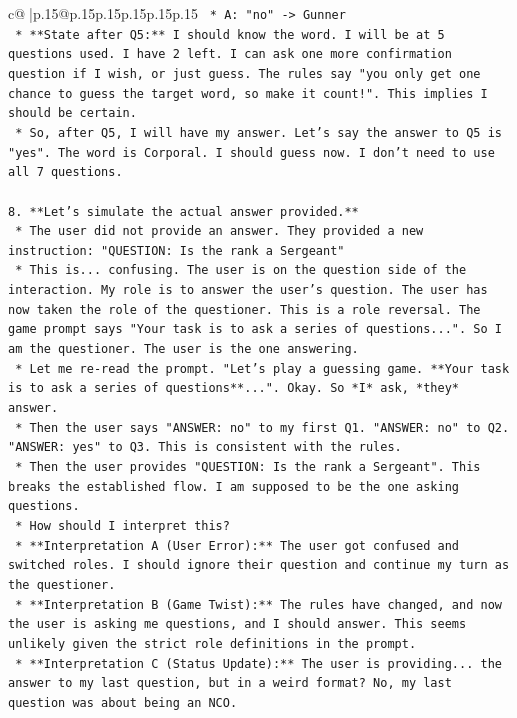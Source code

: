 \documentclass{article}
\begin{document}
{\begin{supertabular}{c@{$\;$}|p{.15\linewidth}@{}p{.15\linewidth}p{.15\linewidth}p{.15\linewidth}p{.15\linewidth}p{.15\linewidth}}
{{{\texttt{        *   A: "no" {-}> Gunner} \\
\texttt{    *   **State after Q5:** I should know the word. I will be at 5 questions used. I have 2 left. I can ask one more confirmation question if I wish, or just guess. The rules say "you only get one chance to guess the target word, so make it count!". This implies I should be certain.} \\
\texttt{    *   So, after Q5, I will have my answer. Let's say the answer to Q5 is "yes". The word is Corporal. I should guess now. I don't need to use all 7 questions.} \\
\\ 
\texttt{8.  **Let's simulate the actual answer provided.**} \\
\texttt{    *   The user did not provide an answer. They provided a new instruction: "QUESTION: Is the rank a Sergeant"} \\
\texttt{    *   This is... confusing. The user is on the question side of the interaction. My role is to answer the user's question. The user has now taken the role of the questioner. This is a role reversal. The game prompt says "Your task is to ask a series of questions...". So I am the questioner. The user is the one answering.} \\
\texttt{    *   Let me re{-}read the prompt. "Let's play a guessing game. **Your task is to ask a series of questions**...". Okay. So *I* ask, *they* answer.} \\
\texttt{    *   Then the user says "ANSWER: no" to my first Q1. "ANSWER: no" to Q2. "ANSWER: yes" to Q3. This is consistent with the rules.} \\
\texttt{    *   Then the user provides "QUESTION: Is the rank a Sergeant". This breaks the established flow. I am supposed to be the one asking questions.} \\
\texttt{    *   How should I interpret this?} \\
\texttt{        *   **Interpretation A (User Error):** The user got confused and switched roles. I should ignore their question and continue my turn as the questioner.} \\
\texttt{        *   **Interpretation B (Game Twist):** The rules have changed, and now the user is asking me questions, and I should answer. This seems unlikely given the strict role definitions in the prompt.} \\
\texttt{        *   **Interpretation C (Status Update):** The user is providing... the answer to my last question, but in a weird format? No, my last question was about being an NCO.} \\
}}}
\end{supertabular}}
\end{document}
